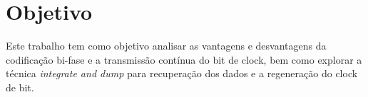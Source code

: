 \newpage
\section{Objetivo}
Este trabalho tem como objetivo analisar as vantagens e desvantagens da codificação bi-fase e a transmissão contínua do bit de clock, bem como explorar a técnica \textit{integrate and dump} para recuperação dos dados e a regeneração do clock de bit.
